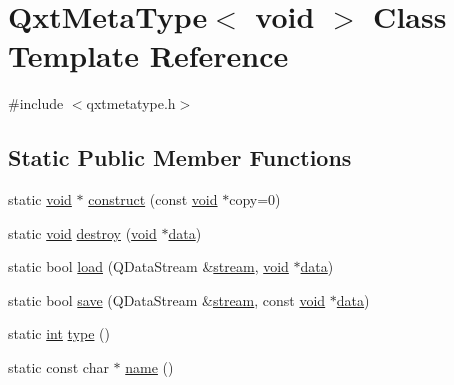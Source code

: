 \hypertarget{class_qxt_meta_type_3_01void_01_4}{\section{Qxt\-Meta\-Type$<$ void $>$ Class Template Reference}
\label{class_qxt_meta_type_3_01void_01_4}
}


{\ttfamily \#include $<$qxtmetatype.\-h$>$}

\subsection*{Static Public Member Functions}
\begin{DoxyCompactItemize}
\item 
static \hyperlink{group___u_a_v_objects_plugin_ga444cf2ff3f0ecbe028adce838d373f5c}{void} $\ast$ \hyperlink{class_qxt_meta_type_3_01void_01_4_a6ec7afe2d3c74869096a0f39daca3dca}{construct} (const \hyperlink{group___u_a_v_objects_plugin_ga444cf2ff3f0ecbe028adce838d373f5c}{void} $\ast$copy=0)
\item 
static \hyperlink{group___u_a_v_objects_plugin_ga444cf2ff3f0ecbe028adce838d373f5c}{void} \hyperlink{class_qxt_meta_type_3_01void_01_4_a646f1366fd94c5c135c9dcbf3cdad56b}{destroy} (\hyperlink{group___u_a_v_objects_plugin_ga444cf2ff3f0ecbe028adce838d373f5c}{void} $\ast$\hyperlink{glext_8h_a8850df0785e6fbcc2351af3b686b8c7a}{data})
\item 
static bool \hyperlink{class_qxt_meta_type_3_01void_01_4_a6a06541d5c12c843171c6e4d4deb54bd}{load} (Q\-Data\-Stream \&\hyperlink{ioapi_8h_a4ed0a20697a8c37f8af699a8ec6d76a8}{stream}, \hyperlink{group___u_a_v_objects_plugin_ga444cf2ff3f0ecbe028adce838d373f5c}{void} $\ast$\hyperlink{glext_8h_a8850df0785e6fbcc2351af3b686b8c7a}{data})
\item 
static bool \hyperlink{class_qxt_meta_type_3_01void_01_4_accd0e12dd0649171c47640d5acec75f1}{save} (Q\-Data\-Stream \&\hyperlink{ioapi_8h_a4ed0a20697a8c37f8af699a8ec6d76a8}{stream}, const \hyperlink{group___u_a_v_objects_plugin_ga444cf2ff3f0ecbe028adce838d373f5c}{void} $\ast$\hyperlink{glext_8h_a8850df0785e6fbcc2351af3b686b8c7a}{data})
\item 
static \hyperlink{ioapi_8h_a787fa3cf048117ba7123753c1e74fcd6}{int} \hyperlink{class_qxt_meta_type_3_01void_01_4_a1ccf8732ab5fa0f3744721503958cefc}{type} ()
\item 
static const char $\ast$ \hyperlink{class_qxt_meta_type_3_01void_01_4_acb04ae6a1d813b8c831930f455fff39d}{name} ()
\end{DoxyCompactItemize}



